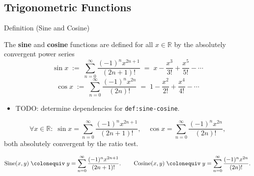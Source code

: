 
\subsection*{Trigonometric Functions}
\label{sec:trigonometric}

\begin{definitionbox}{Definition (Sine and Cosine)}
\begin{definition}
\label{def:sine-cosine}
The \textbf{sine} and \textbf{cosine} functions are defined for all
$x \in \mathbb{R}$ by the absolutely convergent power series
\[
  \sin x \;:=\;
  \sum_{n=0}^{\infty} \frac{(-1)^n x^{2n+1}}{(2n+1)!}
  \;=\; x - \frac{x^3}{3!} + \frac{x^5}{5!} - \cdots
\]
\[
  \cos x \;:=\;
  \sum_{n=0}^{\infty} \frac{(-1)^n x^{2n}}{(2n)!}
  \;=\; 1 - \frac{x^2}{2!} + \frac{x^4}{4!} - \cdots
\]
\end{definition}
\end{definitionbox}

\begin{dependencies}
\begin{itemize}
  \item TODO: determine dependencies for \texttt{def:sine-cosine}.
\end{itemize}
\end{dependencies}

\begin{remark*}
\[
  \forall x \in \mathbb{R} :\;
  \sin x = \sum_{n=0}^\infty \frac{(-1)^n x^{2n+1}}{(2n+1)!},
  \quad
  \cos x = \sum_{n=0}^\infty \frac{(-1)^n x^{2n}}{(2n)!},
\]
both absolutely convergent by the ratio test.
\end{remark*}

\begin{remark*}
\[
  \operatorname{Sine}(x,y)
  \;\colonequiv\;
  y = \sum_{n=0}^\infty \frac{(-1)^n x^{2n+1}}{(2n+1)!}.
  \qquad
  \operatorname{Cosine}(x,y)
  \;\colonequiv\;
  y = \sum_{n=0}^\infty \frac{(-1)^n x^{2n}}{(2n)!}.
\]
\end{remark*}

